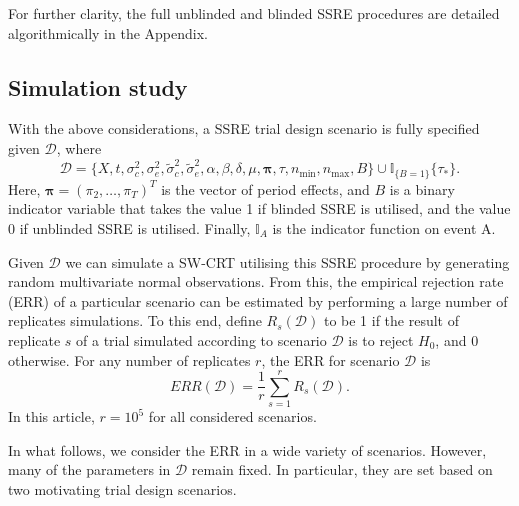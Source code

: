 \documentclass{article}
\begin{document}
For further clarity, the full unblinded and blinded SSRE procedures are detailed algorithmically in the Appendix.

\subsection{Simulation study}\label{sim}

With the above considerations, a SSRE trial design scenario is fully specified given $\mathscr{D}$, where
\[ \mathscr{D}=\{X,t,\sigma_c^2,\sigma_e^2,\tilde{\sigma}_c^2,\tilde{\sigma}_e^2,\alpha,\beta,\delta,\mu,\boldsymbol{\pi},\tau,n_\text{min},n_\text{max},B\}\cup \mathbb{I}_{\{B=1\}}\{\tau_*\}.\]
Here, $\boldsymbol{\pi}=(\pi_2,\dots,\pi_T)^T$ is the vector of period effects, and $B$ is a binary indicator variable that takes the value 1 if blinded SSRE is utilised, and the value 0 if unblinded SSRE is utilised. Finally, $\mathbb{I}_A$ is the indicator function on event A.

Given $\mathscr{D}$ we can simulate a SW-CRT utilising this SSRE procedure by generating random multivariate normal observations. From this, the empirical rejection rate (ERR) of a particular scenario can be estimated by performing a large number of replicates simulations. To this end, define $R_s(\mathscr{D})$ to be 1 if the result of replicate $s$ of a trial simulated according to scenario $\mathscr{D}$ is to reject $H_0$, and 0 otherwise. For any number of replicates $r$, the ERR for scenario $\mathscr{D}$ is
\[ ERR(\mathscr{D})=\frac{1}{r} \sum_{s=1}^r R_s(\mathscr{D}).\]
In this article, $r=10^5$ for all considered scenarios.

In what follows, we consider the ERR in a wide variety of scenarios. However, many of the parameters in $\mathscr{D}$ remain fixed. In particular, they are set based on two motivating trial design scenarios.
\end{document}
